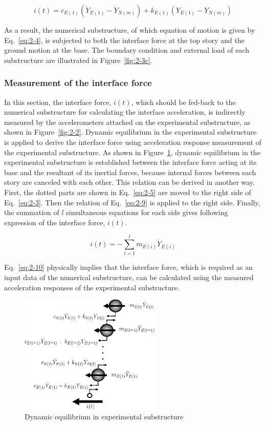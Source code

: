 \begin{equation}\label{eq:2-9}
i(t)=c_{E(1)}\left(\dot{Y}_{E(1)}-\dot{Y}_{N(m)}\right)+k_{E(1)}\left(Y_{E(1)}-Y_{N(m)}\right)
\end{equation}

As a result, the numerical substructure, of which equation of motion is given by Eq.~\eqref{eq:2-4}, is subjected to both the interface force at the top story and the ground motion at the base. The boundary condition and external load of each substructure are illustrated in Figure~\ref{fig:2-3c}.


\subsubsection{Measurement of the interface force}

In this section, the interface force, $i(t)$, which should be fed-back to the numerical substructure for calculating the interface acceleration, is indirectly measured by the accelerometers attached on the experimental substructure, as shown in Figure~\ref{fig:2-2}. Dynamic equilibrium in the experimental substructure is applied to derive the interface force using acceleration response measurement of the experimental substructure. As shown in Figure~\ref{fig4:dynamic}, dynamic equilibrium in the experimental substructure is established between the interface force acting at its base and the resultant of its inertial forces, because internal forces between each story are canceled with each other. This relation can be derived in another way. First, the dotted parts are shown in Eq.~\eqref{eq:2-5} are moved to the right side of Eq.~\eqref{eq:2-3}. Then the relation of Eq.~\eqref{eq:2-9} is applied to the right side. Finally, the summation of $l$ simultaneous equations for each side gives following expression of the interface force, $i(t)$.

\begin{equation}\label{eq:2-10}
i(t)=-\sum_{i=1}^{l}m_{E(i)}\ddot{Y}_{E(i)}
\end{equation}

Eq.~\eqref{eq:2-10} physically implies that the interface force, which is required as an input data of the numerical substructure, can be calculated using the measured acceleration responses of the experimental substructure.

\begin{figure}[ht]
\centering
\includegraphics[width=0.6\textwidth] {figure/2-4.eps}
\caption{Dynamic equilibrium in experimental substructure}
\label{fig4:dynamic}
\end{figure}

